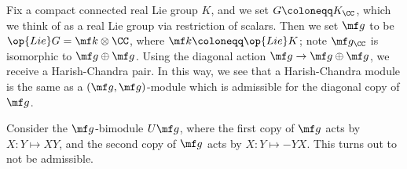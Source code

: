 \documentclass[../notes.tex]{subfiles}
\begin{document}
\begin{example}
	Fix a compact connected real Lie group $K$, and we set $G\coloneqq K_\CC$, which we think of as a real Lie group via restriction of scalars. Then we set $\mf g$ to be $\op{Lie}G=\mf k\otimes\CC$, where $\mf k\coloneqq\op{Lie}K$; note $\mf g_\CC$ is isomorphic to $\mf g\oplus\mf g$. Using the diagonal action $\mf g\to\mf g\oplus\mf g$, we receive a Harish-Chandra pair. In this way, we see that a Harish-Chandra module is the same as a $(\mf g,\mf g)$-module which is admissible for the diagonal copy of $\mf g$.
\end{example}
\begin{example}
	Consider the $\mf g$-bimodule $U\mf g$, where the first copy of $\mf g$ acts by $X\colon Y\mapsto XY$, and the second copy of $\mf g$ acts by $X\colon Y\mapsto-YX$. This turns out to not be admissible.
\end{example}
\end{document}

